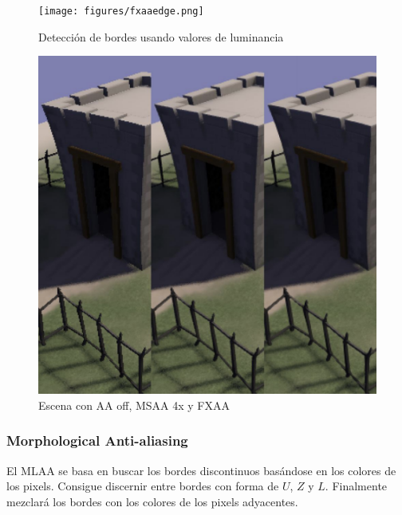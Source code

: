 \documentclass[withindex, glossary]{cam-thesis}
\begin{document}
\begin{figure}[!htbp]
    \texttt{[image: figures/fxaaedge.png]}
    \caption{Detección de bordes usando valores de luminancia\cite{fxaa2}\label{fxaaedge}}
\end{figure}

\begin{figure}[!htbp]
    \includegraphics[width=.8\linewidth]{figures/fxaacomparison.png}
    \caption{Escena con AA off, MSAA 4x y FXAA\label{fxaacomparison}}
\end{figure}

\subsubsection{Morphological Anti-aliasing}

El MLAA\cite{Reshetov:2009:MA:1572769.1572787} se basa en buscar los bordes discontinuos basándose en los colores de los pixels. Consigue discernir entre bordes con forma de $U$, $Z$ y $L$. Finalmente mezclará los bordes con los colores de los pixels adyacentes.
\end{document}
